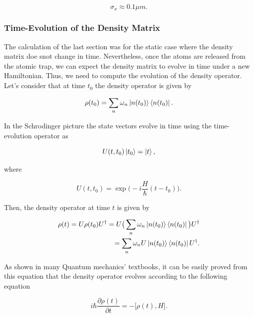 \documentclass{article}
\begin{document}
\begin{equation}
    \sigma_{x} \approx 0.1 \mu m.
\end{equation}

\subsubsection{Time-Evolution of the Density Matrix}
The calculation of the last section was for the static case where the density matrix doe snot change in time. Nevertheless, once the atoms are released from the atomic trap, we can expect the density matrix to evolve in time under a new Hamiltonian. Thus, we need to compute the evolution of the density operator. Let's consider that at time $t_{0}$ the density operator is given by

\begin{equation}
    \rho(t_{0}) = \sum_{n} \omega_{n} \ket{n(t_{0})}\bra{n(t_{0})}.
\end{equation}

In the Schrodinger picture the state vectors evolve in time using the time-evolution operator as

\begin{equation}
    U(t, t_{0}) \ket{t_{0}} = \ket{t},
\end{equation}

where

\begin{equation}
    U(t,t_{0}) = \exp \bigg( -i \frac{H}{\hbar} (t-t_{0}) \bigg).
\end{equation}

Then, the density operator at time $t$ is given by

\begin{equation}
    \begin{split}
        \rho(t) = U \rho(t_{0}) U^{\dagger} = U \big( \sum_{n} \omega_{n} \ket{n(t_{0})}\bra{n(t_{0})} \big) U^{\dagger} \\ = \sum_{n} \omega_{n} U \ket{n(t_{0})}\bra{n(t_{0})} U^{\dagger}. 
    \end{split}
\end{equation}

As shown in many Quantum mechanics' textbooks, it can be easily proved from this equation that the density operator evolves according to the following equation

\begin{equation}
    i\hbar \frac{\partial \rho(t)}{\partial t} = - \big[\rho(t), H \big].
\end{equation}
\end{document}
